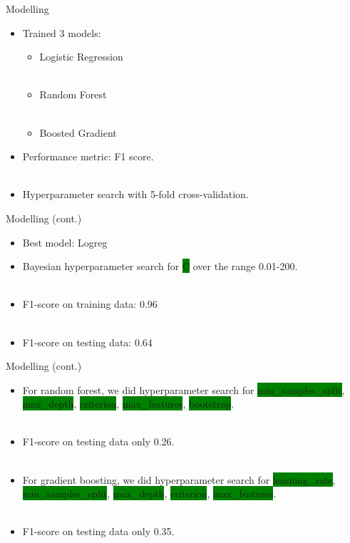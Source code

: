 \documentclass[14pt]{beamer}
\begin{document}
\begin{frame}{\small Modelling}
\begin{itemize}
    \item Trained 3 models:
    \begin{itemize}
        \item Logistic Regression\\~\
        \item Random Forest\\~\
        \item Boosted Gradient
    \end{itemize}
    \item Performance metric: F1 score.\\~\
    \item Hyperparameter search with 5-fold cross-validation.
\end{itemize}
\end{frame}

\begin{frame}{\small Modelling (cont.)}
\begin{itemize}
    \item Best model: Logreg
    \item Bayesian hyperparameter search for \colorbox{green}{C} over the range 0.01-200.\\~\
    \item F1-score on training data: 0.96\\~\
    \item F1-score on testing data: 0.64
\end{itemize}
\end{frame}

\begin{frame}{\small Modelling (cont.)}
\begin{itemize}
    \item For random forest, we did hyperparameter search for \colorbox{green}{min\_samples\_split}, \colorbox{green}{max\_depth}, \colorbox{green}{criterion}, \colorbox{green}{max\_features}, \colorbox{green}{bootstrap}. \\~\
    \item F1-score on testing data only 0.26.\\~\
    \item For gradient boosting, we did hyperparameter search for \colorbox{green}{learning\_rate}, \colorbox{green}{min\_samples\_split}, \colorbox{green}{max\_depth}, \colorbox{green}{criterion}, \colorbox{green}{max\_features}.\\~\
    \item F1-score on testing data only 0.35.
\end{itemize}
\end{frame}
\end{document}
